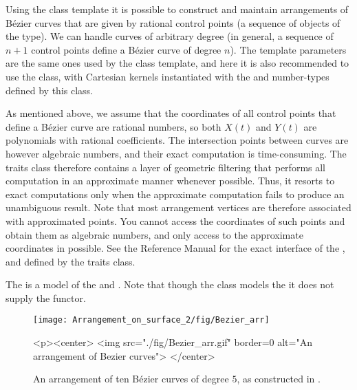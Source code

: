 Using the 
class template it is possible to construct and maintain arrangements of
B\'ezier curves that are given by rational control points (a sequence
of objects of the  type). We can handle curves
of arbitrary degree (in general, a sequence of $n+1$ control points define a 
B\'ezier curve of degree $n$). The template parameters are the same ones
used by the  class template, and here it is also
recommended to use the  class, with
Cartesian kernels instantiated with the  and 
number-types defined by this class.

As mentioned above, we assume that the coordinates of all control
points that define a B\'ezier curve are rational numbers, so both $X(t)$
and $Y(t)$ are polynomials with rational coefficients. The intersection
points between curves are however algebraic numbers, and their exact
computation is time-consuming. The traits class therefore contains a layer
of geometric filtering that performs all computation in an approximate
manner whenever possible. Thus, it resorts to exact computations only when
the approximate computation fails to produce an unambiguous result.
Note that most arrangement vertices are therefore associated with approximated
points. You cannot access the coordinates of such points and obtain them as
algebraic numbers, and only access to the approximate coordinates in possible.
See the Reference Manual for the exact interface of the ,
 and  defined by the traits class.

The  is a model of the
 and .
Note that though the class models the
 it does not supply the
 functor.

\begin{figure}[t]
\begin{ccTexOnly}
  \begin{center}
  \texttt{[image: Arrangement\_on\_surface\_2/fig/Bezier\_arr]}
  \end{center}
\end{ccTexOnly}
\begin{ccHtmlOnly}
  <p><center>
  <img src="./fig/Bezier_arr.gif" border=0 alt="An arrangement of Bezier curves">
  </center>
\end{ccHtmlOnly}
\caption{An arrangement of ten B\'ezier curves of degree $5$, as
constructed in .\label{arr_fig:ex_bez}}
\end{figure}

